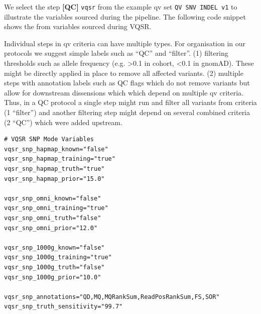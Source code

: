 
We select the step \textbf{[QC]} \colorbox{kispiblue!30}{\texttt{vqsr}} from the example \ac{qv} set
\colorbox{colorSUNSET2!60}{\texttt{QV SNV INDEL v1}}
to illustrate the variables sourced during the pipeline.
The following code snippet shows the from variables sourced during VQSR. 


Individual steps in \ac{qv} criteria can have multiple types. 
For organisation in our protocols we suggest simple labels such as ``QC'' and ``filter''. 
(1) filtering thresholds such as allele frequency (e.g. >0.1 in cohort, <0.1 in gnomAD). These might be directly applied in place to remove all affected variants. 
(2) multiple steps with annotation labels such as QC flags which do not remove variants but allow for downstream dissensions which which depend on multiple \ac{qv} criteria. 
Thus, in a QC protocol a single step might run and filter all variants from criteria (1 ``filter'') and another filtering step might depend on several combined criteria (2 ``QC'') which were added upstream.

\begin{tcolorbox}[
    breakable,  %
    colback=white!0,  %
    colframe=black,  %
    boxrule=1pt,  %
    arc=1mm,  %
    outer arc=1mm,
     title=\textbf{\refstepcounter{myboxcounter}\label{box:qv_variables_example}Box \themyboxcounter: Example QV variables - extract from QV1 variables file}
]

\begin{verbatim}
# VQSR SNP Mode Variables
vqsr_snp_hapmap_known="false"
vqsr_snp_hapmap_training="true"
vqsr_snp_hapmap_truth="true"
vqsr_snp_hapmap_prior="15.0"

vqsr_snp_omni_known="false"
vqsr_snp_omni_training="true"
vqsr_snp_omni_truth="false"
vqsr_snp_omni_prior="12.0"

vqsr_snp_1000g_known="false"
vqsr_snp_1000g_training="true"
vqsr_snp_1000g_truth="false"
vqsr_snp_1000g_prior="10.0"

vqsr_snp_annotations="QD,MQ,MQRankSum,ReadPosRankSum,FS,SOR"
vqsr_snp_truth_sensitivity="99.7"

\end{verbatim}
\end{tcolorbox}

